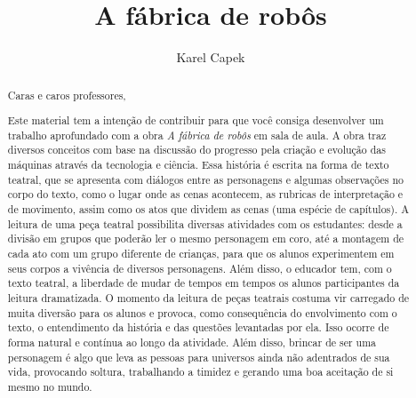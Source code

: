 \documentclass[11pt]{extarticle}
\newcommand{\AutorLivro}{Karel Capek}
\newcommand{\TituloLivro}{A fábrica de robôs}
\newcommand{\colaborador}{Gabriela Karam}
\begin{document}
\title{\TituloLivro}
\author{\AutorLivro}
\def\authornotes{\colaborador}

\date{}
\maketitle


\tableofcontents


\begin{abstract}

Caras e caros professores,

Este material tem a intenção de contribuir para que você consiga desenvolver um trabalho aprofundado com a obra \textit{A fábrica de robôs} em sala de aula. A obra traz diversos conceitos com base na discussão do progresso pela criação e evolução das máquinas através da tecnologia e ciência. Essa história é escrita na forma de texto teatral, que se apresenta com diálogos entre as personagens e algumas observações no corpo do texto, como o lugar onde as cenas acontecem, as rubricas de interpretação e de movimento, assim como os atos que dividem as cenas (uma espécie de capítulos). A leitura de uma peça teatral possibilita diversas atividades com os estudantes: desde a divisão em grupos que poderão ler o mesmo personagem em coro, até a montagem de cada ato com um grupo diferente de crianças, para que os alunos experimentem em seus corpos a vivência de diversos personagens. Além disso, o educador tem, com o texto teatral, a liberdade de mudar de tempos em tempos os alunos participantes da leitura dramatizada. O momento da leitura de peças teatrais costuma vir carregado de muita diversão para os alunos e provoca, como consequência do envolvimento com o texto, o entendimento da história e das questões levantadas por ela. Isso ocorre de forma natural e contínua ao longo da atividade. Além disso, brincar de ser uma personagem é algo que leva as pessoas para universos ainda não adentrados de sua vida, provocando soltura, trabalhando a timidez e gerando uma boa aceitação de si mesmo no mundo.


\end{abstract}
\end{document}
